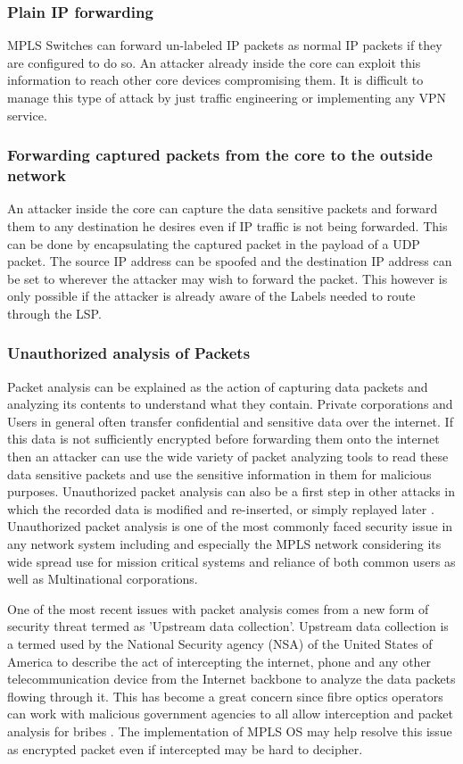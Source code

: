 \subsubsection{Plain IP forwarding}
MPLS Switches can forward un-labeled IP packets as normal IP packets if they are configured to do so. An attacker already inside the core can exploit this information to reach other core devices compromising them. It is difficult to manage this type of attack by just traffic engineering or implementing any VPN service.

\subsubsection{Forwarding captured packets from the core to the outside network}
An attacker inside the core can capture the data sensitive packets and forward them to any destination he desires even if IP traffic is not being forwarded. This can be done by encapsulating the captured packet in the payload of a UDP packet. The source IP address can be spoofed and the destination IP address can be set to wherever the attacker may wish to forward the packet. This however is only possible if the attacker is already aware of the Labels needed to route through the LSP.

\subsubsection{Unauthorized analysis of Packets}
Packet analysis can be explained as the action of capturing data packets and analyzing its contents to understand what they contain. Private corporations and Users in general often transfer confidential and sensitive data over the internet. If this data is not sufficiently encrypted before forwarding them onto the internet then an attacker can use the wide variety of packet analyzing tools to read these data sensitive packets and use the sensitive information in them for malicious purposes. Unauthorized packet analysis can also be a first step in other attacks in which the recorded data is modified and re-inserted, or simply replayed later \cite{rfc5920}. Unauthorized packet analysis is one of the most commonly faced security issue in any network system including and especially the MPLS network considering its wide spread use for mission critical systems and reliance of both common users as well as Multinational corporations.

One of the most recent issues with packet analysis comes from a new form of security threat termed as 'Upstream data collection'. Upstream data collection is a termed used by the National Security agency (NSA) of the United States of America to describe the act of intercepting the internet, phone and any other telecommunication device from the Internet backbone to analyze the data packets flowing through it. This has become a great concern since fibre optics operators can work with malicious government agencies to all allow interception and packet analysis for bribes \cite{NSA}. The implementation of MPLS OS may help resolve this issue as encrypted packet even if intercepted may be hard to decipher.
	

